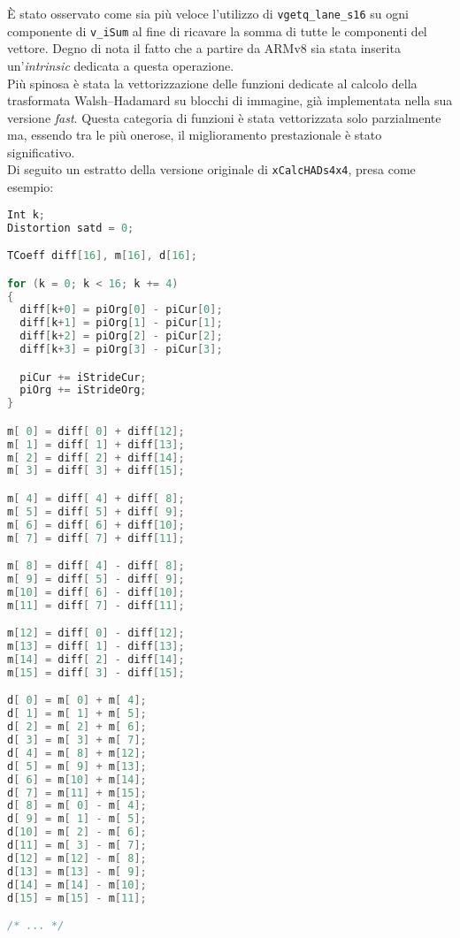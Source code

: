 \`E stato osservato come sia più veloce l'utilizzo di \verb|vgetq_lane_s16| su 
ogni componente di \verb|v_iSum| al fine di ricavare la somma di tutte le 
componenti del vettore. Degno di nota il fatto che a partire da ARMv8 sia stata 
inserita un'\emph{intrinsic} dedicata a questa operazione.\\

Più spinosa è stata la vettorizzazione delle funzioni dedicate al calcolo della 
trasformata Walsh–Hadamard su blocchi di immagine, già implementata nella sua 
versione \emph{fast}. Questa categoria di funzioni è stata vettorizzata solo 
parzialmente ma, essendo tra le più onerose, il miglioramento prestazionale è 
stato significativo.\\

Di seguito un estratto della versione originale di \verb|xCalcHADs4x4|, presa 
come esempio:

\begin{lstlisting}[language=C]
Int k;
Distortion satd = 0;

TCoeff diff[16], m[16], d[16];

for (k = 0; k < 16; k += 4)
{
  diff[k+0] = piOrg[0] - piCur[0];
  diff[k+1] = piOrg[1] - piCur[1];
  diff[k+2] = piOrg[2] - piCur[2];
  diff[k+3] = piOrg[3] - piCur[3];

  piCur += iStrideCur;
  piOrg += iStrideOrg;
}

m[ 0] = diff[ 0] + diff[12];
m[ 1] = diff[ 1] + diff[13];
m[ 2] = diff[ 2] + diff[14];
m[ 3] = diff[ 3] + diff[15];

m[ 4] = diff[ 4] + diff[ 8];
m[ 5] = diff[ 5] + diff[ 9];
m[ 6] = diff[ 6] + diff[10];
m[ 7] = diff[ 7] + diff[11];

m[ 8] = diff[ 4] - diff[ 8];
m[ 9] = diff[ 5] - diff[ 9];
m[10] = diff[ 6] - diff[10];
m[11] = diff[ 7] - diff[11];

m[12] = diff[ 0] - diff[12];
m[13] = diff[ 1] - diff[13];
m[14] = diff[ 2] - diff[14];
m[15] = diff[ 3] - diff[15];

d[ 0] = m[ 0] + m[ 4];
d[ 1] = m[ 1] + m[ 5];
d[ 2] = m[ 2] + m[ 6];
d[ 3] = m[ 3] + m[ 7];
d[ 4] = m[ 8] + m[12];
d[ 5] = m[ 9] + m[13];
d[ 6] = m[10] + m[14];
d[ 7] = m[11] + m[15];
d[ 8] = m[ 0] - m[ 4];
d[ 9] = m[ 1] - m[ 5];
d[10] = m[ 2] - m[ 6];
d[11] = m[ 3] - m[ 7];
d[12] = m[12] - m[ 8];
d[13] = m[13] - m[ 9];
d[14] = m[14] - m[10];
d[15] = m[15] - m[11];

/* ... */
\end{lstlisting}

